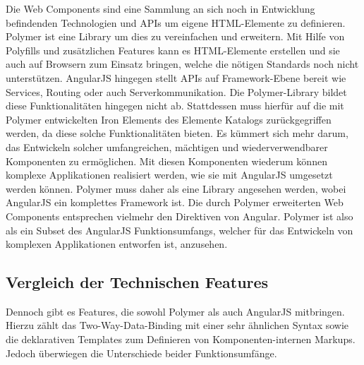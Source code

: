 Die Web Components sind eine Sammlung an sich noch in Entwicklung befindenden Technologien und APIs um eigene \ac{HTML}-Elemente zu definieren. Polymer ist eine Library um dies zu vereinfachen und erweitern. Mit Hilfe von Polyfills und zusätzlichen Features kann es \ac{HTML}-Elemente erstellen und sie auch auf Browsern zum Einsatz bringen, welche die nötigen Standards noch nicht unterstützen. AngularJS hingegen stellt APIs auf Framework-Ebene bereit wie Services, Routing oder auch Serverkommunikation. Die Polymer-Library bildet diese Funktionalitäten hingegen nicht ab. Stattdessen muss hierfür auf die mit Polymer entwickelten Iron Elements des Elemente Katalogs zurückgegriffen werden, da diese solche Funktionalitäten bieten. Es kümmert sich mehr darum, das Entwickeln solcher umfangreichen, mächtigen und wiederverwendbarer Komponenten zu ermöglichen. Mit diesen Komponenten wiederum können komplexe Applikationen realisiert werden, wie sie mit AngularJS umgesetzt werden können. Polymer muss daher als eine Library angesehen werden, wobei AngularJS ein komplettes Framework ist. Die durch Polymer erweiterten Web Components entsprechen vielmehr den Direktiven von Angular. Polymer ist also als ein Subset des AngularJS Funktionsumfangs, welcher für das Entwickeln von komplexen Applikationen entworfen ist, anzusehen.


\subsection{Vergleich der Technischen Features}\label{vergleich-der-technische-features}

Dennoch gibt es Features, die sowohl Polymer als auch AngularJS mitbringen. Hierzu zählt das Two-Way-Data-Binding mit einer sehr ähnlichen Syntax sowie die deklarativen Templates zum Definieren von Komponenten-internen Markups. Jedoch überwiegen die Unterschiede beider Funktionsumfänge.

